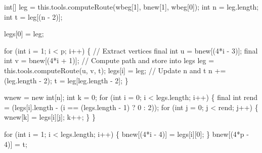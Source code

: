 int[] leg = this.tools.computeRoute(wbeg[1], bnew[1], wbeg[0]);
int n = leg.length;
int t = leg[(n - 2)];

legs[0] = leg;
\nwendcode{}\nwdocspar

\nwenddocs{}\endmoddef\nwstartdeflinemarkup{}\nwenddeflinemarkup
for (int i = 1; i < p; i++) \{
  // Extract vertices
  final int u = bnew[(4*i - 3)];
  final int v = bnew[(4*i + 1)];
  // Compute path and store into legs
  leg = this.tools.computeRoute(u, v, t);
  legs[i] = leg;
  // Update n and t
  n += (leg.length - 2);
  t = leg[leg.length - 2];
\}
\nwendcode{}\nwdocspar

\nwenddocs{}\endmoddef\nwstartdeflinemarkup{}\nwenddeflinemarkup
wnew = new int[n];
int k = 0;
for (int i = 0; i < legs.length; i++) \{
  final int rend = (legs[i].length - (i == (legs.length - 1) ? 0 : 2));
  for (int j = 0; j < rend; j++) \{
    wnew[k] = legs[i][j];
    k++;
  \}
\}
\nwendcode{}\nwdocspar

\nwenddocs{}\endmoddef\nwstartdeflinemarkup{}\nwenddeflinemarkup
for (int i = 1; i < legs.length; i++) \{
  bnew[(4*i - 4)] = legs[i][0];
\}
bnew[(4*p - 4)] = t;
\nwendcode{}\nwdocspar


